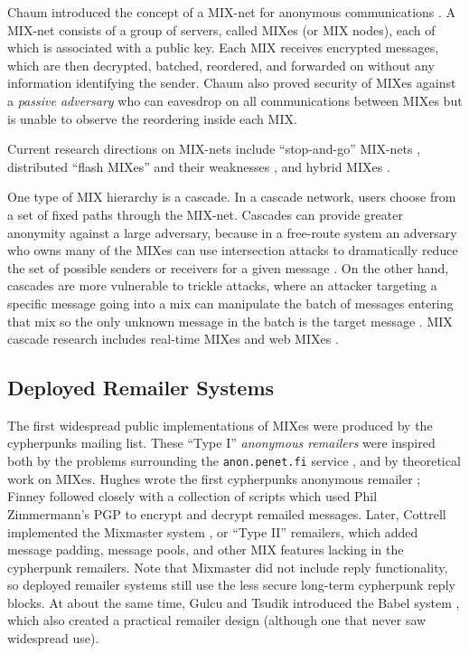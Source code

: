 \documentclass{llncs}
\begin{document}
Chaum introduced the concept of a MIX-net for anonymous communications
\cite{chaum-mix}. A MIX-net consists of a group of servers, called MIXes
(or MIX nodes), each of which is associated with a public key. Each
MIX receives encrypted messages, which are then decrypted, batched,
reordered, and forwarded on without any information identifying the
sender. Chaum also proved security of MIXes against a \emph{passive
adversary} who can eavesdrop on all communications between MIXes but is
unable to observe the reordering inside each MIX.

Current research directions on MIX-nets include ``stop-and-go'' MIX-nets
\cite{kesdogan}, distributed ``flash MIXes'' \cite{flash-mix} and their
weaknesses \cite{desmedt,mitkuro}, and hybrid MIXes \cite{hybrid-mix}.

One type of MIX hierarchy is a cascade.
In a cascade network, users choose from a set of fixed paths through
the MIX-net. Cascades can provide greater anonymity against a large
adversary, because in a free-route system an
adversary who owns many of the MIXes can use intersection attacks to
dramatically reduce the set of possible senders or receivers for a given
message \cite{disad-free-routes}. On the other hand, cascades are more
vulnerable \cite{batching-taxonomy} to trickle attacks, where an attacker
targeting a specific message going into a mix can manipulate the batch
of messages entering that mix so the only unknown message in the batch
is the target message \cite{mixmaster-attacks,babel}.
MIX cascade research includes real-time MIXes \cite{realtime-mix} and
web MIXes \cite{web-mix}.

\subsection{Deployed Remailer Systems}

The first widespread public implementations of MIXes were produced by the
cypherpunks mailing list. These ``Type I'' \emph{anonymous remailers}
were inspired both by the problems surrounding the {\tt anon.penet.fi}
service \cite{helsingius}, and by theoretical work on MIXes. Hughes wrote
the first cypherpunks anonymous remailer \cite{remailer-history}; Finney
followed closely with a collection of scripts which used Phil Zimmermann's
PGP to encrypt and decrypt remailed messages. Later, Cottrell implemented
the Mixmaster system \cite{mixmaster}, or ``Type II'' remailers, which
added message padding, message pools, and other MIX features lacking
in the cypherpunk remailers. Note that Mixmaster did not include reply
functionality, so deployed remailer systems still use the less secure
long-term cypherpunk reply blocks. At about the same time, Gulcu and
Tsudik introduced the Babel system \cite{babel}, which also created a
practical remailer design (although one that never saw widespread use).
\end{document}

